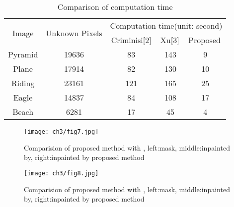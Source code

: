 \begin{table}[!htbp]
\caption{Comparison of computation time}
\label{tab:1}       %
\begin{tabular}{lllll} \hline
\multicolumn{1}{c}{\multirow {2}{*}{Image}}&\multicolumn{1}{c}{\multirow {2}{*}{Unknown Pixels}}& \multicolumn{3}{c}{Computation time(unit: second)}\\
\cline{3-5}
\multicolumn{1}{c}{}&\multicolumn{1}{c}{}& \multicolumn{1}{c}{Criminisi[2]} &Xu[3]&Proposed\\
\hline
\multicolumn{1}{c}{Pyramid} & \multicolumn{1}{c}{19636} & \multicolumn{1}{c}{83} &\multicolumn{1}{c}{143}& \multicolumn{1}{c}{9}\\				
\multicolumn{1}{c}{Plane} & \multicolumn{1}{c}{17914} & \multicolumn{1}{c}{82} &\multicolumn{1}{c}{130}& \multicolumn{1}{c}{10}\\				
\multicolumn{1}{c}{Riding} & \multicolumn{1}{c}{23161} & \multicolumn{1}{c}{121} &\multicolumn{1}{c}{165}& \multicolumn{1}{c}{25}\\
\multicolumn{1}{c}{Eagle} & \multicolumn{1}{c}{14837} & \multicolumn{1}{c}{84} &\multicolumn{1}{c}{108}& \multicolumn{1}{c}{17}\\
\multicolumn{1}{c}{Beach} & \multicolumn{1}{c}{6281} & \multicolumn{1}{c}{17} &\multicolumn{1}{c}{45}& \multicolumn{1}{c}{4}\\
\hline
\end{tabular}
\end{table}\par

\begin{figure}[!htbp]
\begin{center}
  \texttt{[image: ch3/fig7.jpg]}
\end{center}
\caption{Comparision of proposed method with \cite{LeMeur_2011}, left:mask, middle:inpainted by\cite{LeMeur_2011}, right:inpainted by proposed method}
\label{fig:7}       %
\end{figure}

\begin{figure}[!htbp]
\begin{center}
  \texttt{[image: ch3/fig8.jpg]}
\end{center}
\caption{Comparision of proposed method with \cite{kwokFast}, left:mask, middle:inpainted by\cite{kwokFast}, right:inpainted by proposed method}
\label{fig:8}       %
\end{figure}

